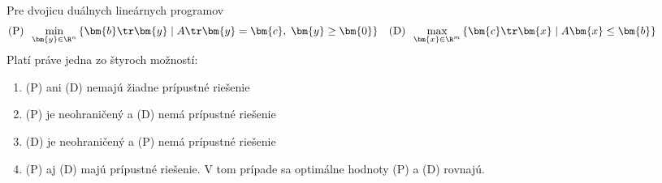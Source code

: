 \begin{framed}
  \begin{veta}
    \label{thm:strongduality}
    Pre dvojicu duálnych lineárnych programov
    \begin{align*}
      \text{(P)}\;\; \min_{\bm{y}\in\R^n}\left\{ \bm{b}\tr\bm{y} \mid A\tr\bm{y}=\bm{c},\;\bm{y}\ge\bm{0}\right\}
      &&
      \text{(D)}\;\;\max_{\bm{x}\in\R^m}\left\{ \bm{c}\tr\bm{x} \mid A\bm{x}\le\bm{b}\right\}\hspace*{10ex}
    \end{align*}
    Platí práve jedna zo štyroch možností:
    \begin{enumerate}
      \item (P) ani (D) nemajú žiadne prípustné riešenie
      \item (P) je neohraničený a (D) nemá prípustné riešenie
      \item (D) je neohraničený a (P) nemá prípustné riešenie
      \item (P) aj (D) majú prípustné riešenie. V tom prípade sa optimálne hodnoty (P) a (D) rovnajú.
    \end{enumerate}
  \end{veta}
\end{framed}

